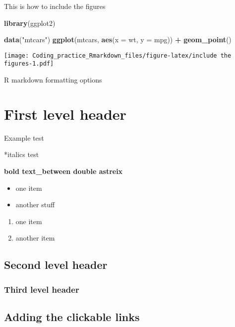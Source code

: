 \documentclass[
]{article}
\newenvironment{Shaded}{\begin{snugshade}}{\end{snugshade}}
\newcommand{\AttributeTok}[1]{\textcolor[rgb]{0.13,0.29,0.53}{#1}}
\newcommand{\FunctionTok}[1]{\textcolor[rgb]{0.13,0.29,0.53}{\textbf{#1}}}
\newcommand{\NormalTok}[1]{#1}
\newcommand{\SpecialCharTok}[1]{\textcolor[rgb]{0.81,0.36,0.00}{\textbf{#1}}}
\newcommand{\StringTok}[1]{\textcolor[rgb]{0.31,0.60,0.02}{#1}}
\providecommand{\tightlist}{%
  \setlength{\itemsep}{0pt}\setlength{\parskip}{0pt}}
\begin{document}
This is how to include the figures

\begin{Shaded}
\begin{Highlighting}[]
\FunctionTok{library}\NormalTok{(ggplot2)}

\FunctionTok{data}\NormalTok{(}\StringTok{"mtcars"}\NormalTok{)}
\FunctionTok{ggplot}\NormalTok{(mtcars, }\FunctionTok{aes}\NormalTok{(}\AttributeTok{x =}\NormalTok{ wt, }\AttributeTok{y =}\NormalTok{ mpg)) }\SpecialCharTok{+}
  \FunctionTok{geom\_point}\NormalTok{()}
\end{Highlighting}
\end{Shaded}

\texttt{[image: Coding\_practice\_Rmarkdown\_files/figure-latex/include the figures-1.pdf]}

R markdown formatting options

\section{First level header}\label{first-level-header}

Example test

*italics test

\textbf{bold text\_between double astreix}

\begin{itemize}
\tightlist
\item
  one item
\item
  another stuff
\end{itemize}

\begin{enumerate}
\def\labelenumi{\arabic{enumi}.}
\tightlist
\item
  one item
\item
  another item
\end{enumerate}

\subsection{Second level header}\label{second-level-header}

\subsubsection{Third level header}\label{third-level-header}

\subsection{Adding the clickable
links}\label{adding-the-clickable-links}
\end{document}

